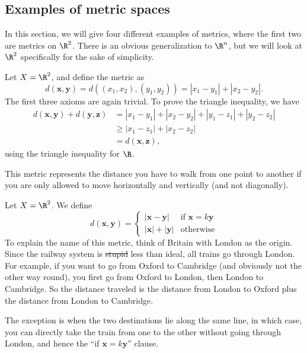 \documentclass[a4paper]{article}
\begin{document}
\subsection{Examples of metric spaces}
In this section, we will give four different examples of metrics, where the first two are metrics on $\R^2$. There is an obvious generalization to $\R^n$, but we will look at $\R^2$ specifically for the sake of simplicity.
\begin{eg}
  Let $X = \R^2$, and define the metric as
  \[
    d(\mathbf{x}, \mathbf{y}) = d((x_1, x_2), (y_1, y_2)) = |x_1 - y_1| + |x_2 - y_2|.
  \]
  The first three axioms are again trivial. To prove the triangle inequality, we have
  \begin{align*}
    d(\mathbf{x}, \mathbf{y}) + d(\mathbf{y}, \mathbf{z}) &= |x_1 - y_1| + |x_2 - y_2| + |y_1 - z_1| + |y_2 - z_2|\\
    &\geq |x_1 - z_1| + |x_2 - z_2|\\
    &= d(\mathbf{x}, \mathbf{z}),
  \end{align*}
  using the triangle inequality for $\R$.

  This metric represents the distance you have to walk from one point to another if you are only allowed to move horizontally and vertically (and not diagonally).
\end{eg}

\begin{eg}
  Let $X = \R^2$. We define
  \[
    d(\mathbf{x}, \mathbf{y}) =
    \begin{cases}
      |\mathbf{x} - \mathbf{y}|&\text{if }\mathbf{x} = k\mathbf{y}\\
      |\mathbf{x}| + |\mathbf{y}|&\text{otherwise}
    \end{cases}
  \]
  To explain the name of this metric, think of Britain with London as the origin. Since the railway system is \st{stupid} less than ideal, all trains go through London. For example, if you want to go from Oxford to Cambridge (and obviously not the other way round), you first go from Oxford to London, then London to Cambridge. So the distance traveled is the distance from London to Oxford plus the distance from London to Cambridge.

  The exception is when the two destinations lie along the same line, in which case, you can directly take the train from one to the other without going through London, and hence the ``if $\mathbf{x} = k\mathbf{y}$'' clause.
\end{eg}
\end{document}
